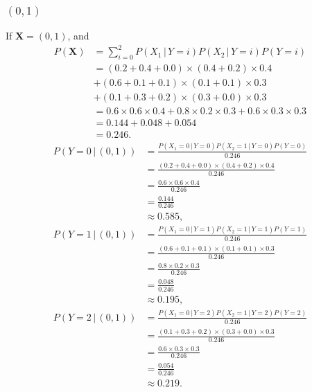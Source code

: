 \documentclass[10pt]{article}
\begin{document}
\subsubsection*{$(0, 1)$}
If $\textbf{X} = (0, 1)$, and
\begin{align*}
P(\textbf{X}) &= \sum_{i = 0}^2 P(X_1 \, | \, Y = i)P(X_2 \, | \, Y = i)P(Y = i) \\
             &= (0.2 + 0.4 + 0.0) \times (0.4 + 0.2) \times 0.4 \\
             &+ (0.6 + 0.1 + 0.1) \times (0.1 + 0.1) \times 0.3 \\
             &+ (0.1 + 0.3 + 0.2) \times (0.3 + 0.0) \times 0.3 \\
             &= 0.6 \times 0.6 \times 0.4 + 0.8 \times 0.2 \times 0.3 + 0.6 \times 0.3 \times 0.3 \\
             &= 0.144 + 0.048 + 0.054 \\
             &= 0.246.
\end{align*}
\begin{align*}
P(Y = 0 \, | \, (0, 1)) &= \frac{P(X_1= 0 \, | \, Y = 0)P(X_2 = 1 \, | \, Y = 0)P(Y = 0)}{ 0.246 } \\
     &= \frac{ (0.2 + 0.4 + 0.0) \times (0.4 + 0.2) \times 0.4 }{ 0.246 } \\
     &= \frac{ 0.6 \times 0.6 \times 0.4 }{ 0.246 } \\
     &= \frac{ 0.144 }{ 0.246 } \\
     &\approx 0.585,
\end{align*}
\begin{align*}
P(Y = 1 \, | \, (0, 1)) &= \frac{ P(X_1 = 0 \, | \, Y = 1)P(X_2 = 1\, | \,  Y = 1)P(Y = 1)}{ 0.246 } \\
     &= \frac{ (0.6 + 0.1 + 0.1) \times (0.1 + 0.1) \times 0.3 }{ 0.246 } \\
     &= \frac{ 0.8 \times 0.2 \times 0.3 }{ 0.246 } \\
     &= \frac{ 0.048 }{ 0.246 } \\
     &\approx 0.195,
\end{align*}
\begin{align*}
P(Y = 2 \, | \, (0, 1)) &= \frac{ P(X_1 = 0 \, | \, Y = 2)P(X_2 = 1 \, | \, Y = 2)P(Y = 2) }{ 0.246 } \\
     &= \frac{ (0.1 + 0.3 + 0.2) \times (0.3 + 0.0) \times 0.3 }{ 0.246 } \\
     &= \frac{ 0.6 \times 0.3 \times 0.3}{ 0.246 } \\
     &= \frac{ 0.054	 }{ 0.246 } \\
     &\approx 0.219.
\end{align*}
\end{document}
